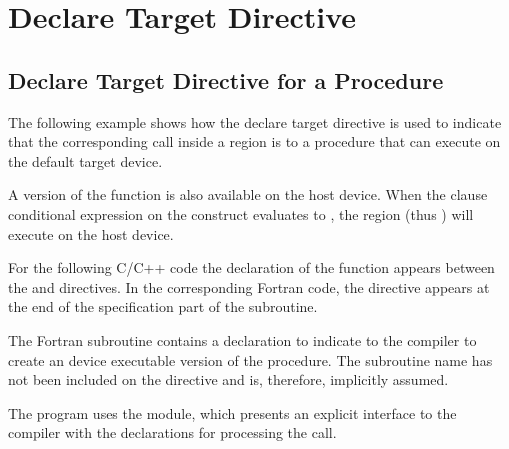 \section{Declare Target Directive}
\label{sec:declare_target}


\subsection{Declare Target Directive for a Procedure}

\label{subsec:declare_target_function}



The following example shows how the declare target directive 
is used to indicate that the corresponding call inside a  region 
is to a  procedure that can execute on the default target device.

A version of the function is also available on the host device. When the  
clause conditional expression on the  construct evaluates to , 
the  region (thus ) will execute on the host device.

For the following C/C++ code the declaration of the function  appears between the 
 and  directives. 
In the corresponding Fortran code, the  directive appears at the
end of the specification part of the subroutine.


The Fortran  subroutine contains a  declaration 
to indicate to the compiler to create an device executable version of the procedure. 
The subroutine name has not been included on the  
directive and is, therefore, implicitly assumed.

The program uses the  module, which presents an explicit interface to 
the compiler with the  declarations for processing 
the  call.

